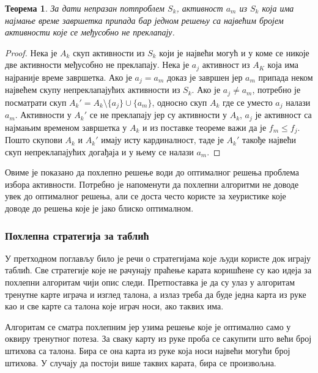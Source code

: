 \documentclass[a4paper, 12pt, ngerman]{article}
\newtheorem{theorem}{Теорема}
\begin{document}
\begin{theorem}
За дати непразан потпроблем $S_k$, активност $a_m$ из $S_k$ која има најмање време завршетка припада бар једном решењу са највећим бројем активности које се међусобно не преклапају.
\end{theorem}

\begin{proof}
Нека је $A_k$ скуп активности из $S_k$ који је највећи могућ и у коме се никоје две активности међусобно не преклапају. Нека је $a_j$ активност из $A_K$ која има најраније време завршетка. Ако је $a_j = a_m$ доказ је завршен јер $a_m$ припада неком највећем скупу непреклапајућих активности из $S_k$. Ако је $a_j \ne a_m$, потребно је посматрати скуп $A_k' = A_k \setminus \{a_j\} \cup \{a_m\}$, односно скуп $A_k$ где се уместо $a_j$ налази $a_m$. Активности у $A_k'$ се не преклапају јер су активности у $A_k$, $a_j$ је активност са најмањим временом завршетка у $A_k$ и из поставке теореме важи да је $f_m \le f_j$. Пошто скупови $A_k$ и $A_k'$ имају исту кардиналност, таде је $A_k'$ такође највећи скуп непреклапајућих догађаја и у њему се налази $a_m$.
\end{proof}

Овиме је показано да похлепно решење води до оптималног решења проблема избора активности. Потребно је напоменути да похлепни алгоритми не доводе увек до оптималног решења, али се доста често користе за хеуристике које доводе до решења које је јако блиско оптималном.

\subsubsection{Похлепна стратегија за таблић}
У претходном поглављу било је речи о стратегијама које људи користе док играју таблић. Све стратегије које не рачунају праћење карата коришћене су као идеја за похлепни алгоритам чији опис следи. Претпоставка је да су улаз у алгоритам тренутне карте играча и изглед талона, а излаз треба да буде једна карта из руке као и све карте са талона које играч носи, ако таквих има.

Алгоритам се сматра похлепним јер узима решење које је оптимално само у оквиру тренутног потеза. За сваку карту из руке проба се сакупити што већи број штихова са талона. Бира се она карта из руке која носи највећи могући број штихова. У случају да постоји више таквих карата, бира се произвољна.
\end{document}
